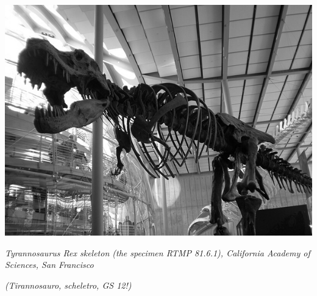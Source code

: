 \begin{center}
\includegraphics[width=0.6\linewidth]{immagini/trex.png}

\emph{Tyrannosaurus Rex skeleton (the specimen RTMP 81.6.1), California Academy of Sciences, San Francisco}

\emph{(Tirannosauro, scheletro, GS 12!)}
\end{center}



\pagebreak
